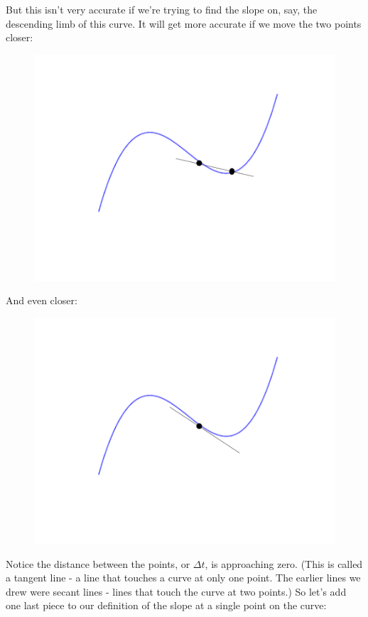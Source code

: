 But this isn't very accurate if we're trying to find the slope on, say, the descending limb of this curve. It will get more accurate if we move the two points closer:

\begin{figure}[H]
    \centering
    \includegraphics[scale=.15]{diagram2}
\end{figure}

And even closer:

\begin{figure}[H]
    \centering
    \includegraphics[scale=.15]{diagram3}
\end{figure}

Notice the distance between the points, or $\Delta t$, is approaching zero. (This is called a tangent line - a line that touches a curve at only one point. The earlier lines we drew were secant lines - lines that touch the curve at two points.) So let's add one last piece to our definition of the slope at a single point on the curve:

